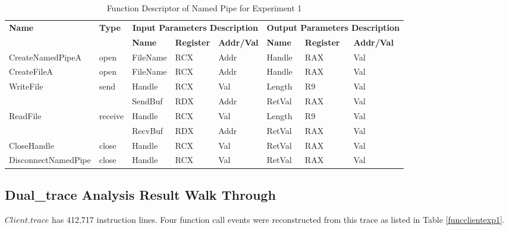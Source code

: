 \begin{table}[H]
  \centering
  \caption{Function Descriptor of Named Pipe for Experiment 1}
  \label{fdescexp1}
  \begin{tabular}{|l|l|l|l|l|l|l|l|}
\hline
             \multirow{2}{*}{{\textbf{Name}}} & \multirow{2}{*}{{\textbf{Type}}} & \multicolumn{3}{c|}{\textbf{Input Parameters Description}} & \multicolumn{3}{c|}{\textbf{Output Parameters Description}} \\
              \cline{3-8} 
             & & \textbf{Name}& \textbf{Register} & \textbf{Addr/Val} & \textbf{Name}& \textbf{Register} &  \textbf{Addr/Val}  \\
             \hline
      CreateNamedPipeA
       &open & FileName & RCX  & Addr &  Handle & RAX & Val\\
      \hline         
      CreateFileA
       &open & FileName & RCX & Addr&  Handle & RAX & Val\\ 
      \hline              
      \multirow{2}{*}{WriteFile}
       &\multirow{2}{*}{send} &  Handle & RCX & Val & Length& R9 &Val\\
        \cline{3-8} 
       & & SendBuf & RDX & Addr & RetVal& RAX & Val\\
      \hline            
      \multirow{2}{*}{ReadFile}
       &\multirow{2}{*}{receive} &  Handle & RCX & Val& Length &R9 & Val\\
        \cline{3-8} 
       & & RecvBuf & RDX  & Addr & RetVal& RAX & Val\\
      \hline            
      CloseHandle &
       close &  Handle & RCX & Val & RetVal& RAX & Val\\
      \hline            
      DisconnectNamedPipe &
      close &  Handle & RCX & Val & RetVal& RAX & Val\\
      \hline               
  \end{tabular}
\end{table}


\subsection{Dual\_trace Analysis Result Walk Through}
$Client.trace$ has 412,717 instruction lines. Four function call events were reconstructed from this trace as listed in Table \ref{funcclientexp1}.

